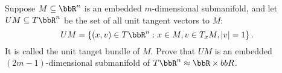 Suppose $M \subseteq \bbR^n$ is an embedded $m$-dimensional submanifold, and let $UM\subseteq T\bbR^n$ be the set of all unit tangent vectors to $M$:
\begin{equation*}
UM = \left\{(x,v)\in T\bbR^n: x\in M, v \in T_xM, \vert v \vert = 1\right\}.
\end{equation*}
It is called the unit tanget bundle of $M$.  Prove that $UM$ is an embedded $(2m-1)$-dimensional submanifold of $T\bbR^n\approx \bbR \times bbR$.